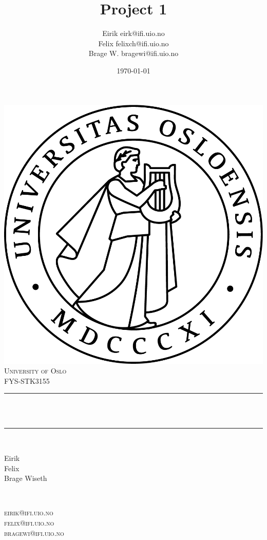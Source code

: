 \documentclass[twoside,11pt]{report}
\title{{\huge Project 1}}
\author{\name Eirik \email eirk@ifi.uio.no \\
       \name Felix  \email felixch@ifi.uio.no \\
       \name Brage W. \email bragewi@ifi.uio.no}
\date{\today}											%
\begin{document}

\begin{titlepage}
	\centering
    \vspace*{0.5 cm}
    \includegraphics[scale = 0.75]{uio.jpg}\\[1.0 cm]	%
    \textsc{\LARGE University of Oslo}\\[2.0 cm]	%
	\textsc{\Large FYS-STK3155}\\[0.5 cm]				%
	\rule{\linewidth}{0.2 mm} \\[0.4 cm]
	{ \huge \bfseries \@title}\\
	\rule{\linewidth}{0.2 mm} \\[1.5 cm]

	\begin{minipage}{0.4\textwidth}
		\begin{flushleft} \normalsize
			Eirik\\
            Felix\\
            Brage Wiseth\\
			\end{flushleft}
			\end{minipage}~
			\begin{minipage}{0.4\textwidth}
			\begin{flushright} \normalsize
        \textsc{
			    eirik@ifi.uio.no\\
          felix@ifi.uio.no\\
          bragewi@ifi.uio.no\\
        }
		\end{flushright}
        

\end{minipage}
\end{titlepage}
\end{document}
